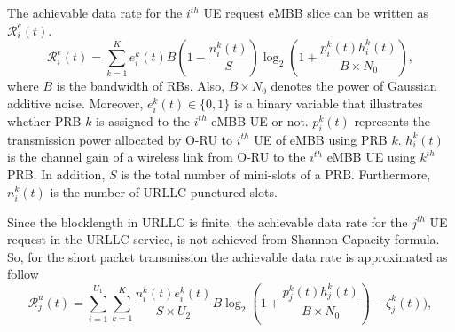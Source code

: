 \documentclass[conference]{IEEEtran}
\begin{document}
The achievable data rate for the $i^{th}$ UE request eMBB slice can be written as $\mathcal{R}_{i}^{e}(t)$.
\begin{equation}\label{eq1}
\mathcal{R}_{i}^e(t) = \sum_{k = 1}^K e^k_i(t) B (1-\frac{n^k_i(t)}{S}) \log_2({1+\frac{p^k_i(t)h^k_i(t)}{B \times N_0}}),
\end{equation}
where $B$ is the bandwidth of RBs. Also, $B\times N_0$ denotes the power of Gaussian additive noise. 
Moreover, $e^k_i(t)\in \{0,1\}$ is a binary variable that illustrates whether PRB $k$ is assigned to the $i^{th}$ eMBB UE or not. 
$p^k_i(t)$ represents the transmission power allocated by O-RU to $i^{th}$ UE of eMBB using PRB $k$.
$h^k_i(t)$ is the channel gain of a wireless link from 
O-RU to the $i^{th}$ eMBB UE using $k^{th}$ PRB. In addition, $S$ is the total number of mini-slots of a PRB. 
Furthermore, $n^k_i(t)$ is the number of URLLC punctured slots. 

Since the blocklength in URLLC is finite, the achievable data rate for the $j^{th}$ UE request in the URLLC service, is not achieved from Shannon Capacity formula. So, for the short packet transmission the achievable data rate is approximated as follow
\begin{equation}\label{eq11}
\mathcal{R}_{j}^u(t) = \sum_{i = 1}^{U_1}\sum_{k=1}^K \frac{n^k_i(t)e^k_i(t)}{S \times U_2} B \log_2({1+\frac{p^k_j(t)h^k_j(t)}{B \times N_0}})- \zeta_{j}^k(t)), 
\end{equation}
\end{document}
